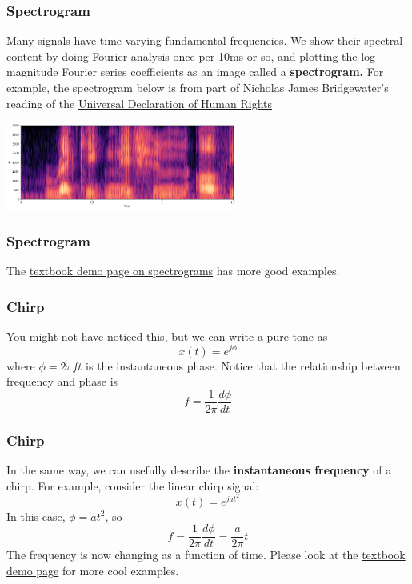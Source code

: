 \documentclass{beamer}
\begin{document}
\begin{frame}
  \frametitle{Spectrogram}

  Many signals have time-varying fundamental frequencies.  We show
  their spectral content by doing Fourier analysis once per 10ms or
  so, and plotting the log-magnitude Fourier series coefficients as an
  image called a {\bf spectrogram.}  For example, the spectrogram
  below is from part of Nicholas James Bridgewater's reading of the
  \href{http://ia800201.us.archive.org/4/items/human_rights_3_librivox/human_rights_03_eng_njb.mp3}{\color{blue}Universal Declaration of Human Rights}
  
  \centerline{\includegraphics[width=3in]{recognitionofthe.png}}
\end{frame}

\begin{frame}
  \frametitle{Spectrogram}

  The \href{https://dspfirst.gatech.edu/chapters/03spect/demos/spectrog/index.html}{\color{blue}textbook demo page on spectrograms} has more good examples.
\end{frame}

\begin{frame}
  \frametitle{Chirp}

  You might not have noticed this, but we can write a pure tone as
  \[
  x(t) = e^{j\phi}
  \]
  where $\phi = 2\pi f t$ is the instantaneous phase.  Notice that
  the relationship between frequency and phase is
  \[
  f = \frac{1}{2\pi} \frac{d\phi}{dt}
  \]
\end{frame}
\begin{frame}
  \frametitle{Chirp}

  In the same way, we can usefully describe the {\bf instantaneous
    frequency} of a chirp.  For example, consider the linear chirp signal:
  \[
  x(t) = e^{ja t^2}
  \]
  In this case, $\phi=at^2$, so 
  \[
  f = \frac{1}{2\pi} \frac{d\phi}{dt} = \frac{a}{2\pi} t
  \]
  The frequency is now changing as a function of time.  Please look at the
  \href{https://dspfirst.gatech.edu/chapters/03spect/demos/spectrog/chirps/}{\color{blue}textbook demo page}
  for more cool examples.
\end{frame}
\end{document}
